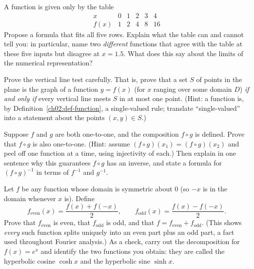 \begin{exercise}
\label{ch02:exc-representations}
A function is given only by the table
\[
  \begin{array}{c|ccccc}
    x & 0 & 1 & 2 & 3 & 4 \\ \hline
    f(x) & 1 & 2 & 4 & 8 & 16
  \end{array}
\]
Propose a formula that fits all five rows. Explain what the table can and
cannot tell you: in particular, name two \emph{different} functions that agree with
the table at these five inputs but disagree at $x = 1.5$. What does this say about
the limits of the numerical representation?
\end{exercise}

\begin{exercise}
\label{ch02:exc-proof-vlt}
Prove the vertical line test carefully. That is, prove that a set $S$ of points in
the plane is the graph of a function $y = f(x)$ (for $x$ ranging over some domain
$D$) \emph{if and only if} every vertical line meets $S$ in at most one point.
(Hint: a function is, by Definition~\ref{ch02:def-function}, a single-valued
rule; translate ``single-valued'' into a statement about the points $(x,y)\in S$.)
\end{exercise}

\begin{exercise}
\label{ch02:exc-proof-injective}
Suppose $f$ and $g$ are both one-to-one, and the composition $f \circ g$ is
defined. Prove that $f \circ g$ is also one-to-one. (Hint: assume
$(f\circ g)(x_1) = (f\circ g)(x_2)$ and peel off one function at a time, using
injectivity of each.) Then explain in one sentence why this guarantees $f \circ g$
has an inverse, and state a formula for $(f \circ g)^{-1}$ in terms of $f^{-1}$ and
$g^{-1}$.
\end{exercise}

\begin{exercise}
\label{ch02:exc-proof-decomp}
Let $f$ be any function whose domain is symmetric about $0$ (so $-x$ is in the
domain whenever $x$ is). Define
\[
  f_{\text{even}}(x) = \frac{f(x) + f(-x)}{2}, \qquad
  f_{\text{odd}}(x) = \frac{f(x) - f(-x)}{2}.
\]
Prove that $f_{\text{even}}$ is even, that $f_{\text{odd}}$ is odd, and that
$f = f_{\text{even}} + f_{\text{odd}}$. (This shows \emph{every} such function
splits uniquely into an even part plus an odd part, a fact used throughout
Fourier analysis.) As a check, carry out the decomposition for $f(x) = e^x$ and
identify the two functions you obtain: they are called the hyperbolic cosine
$\cosh x$ and the hyperbolic sine $\sinh x$.
\end{exercise}

